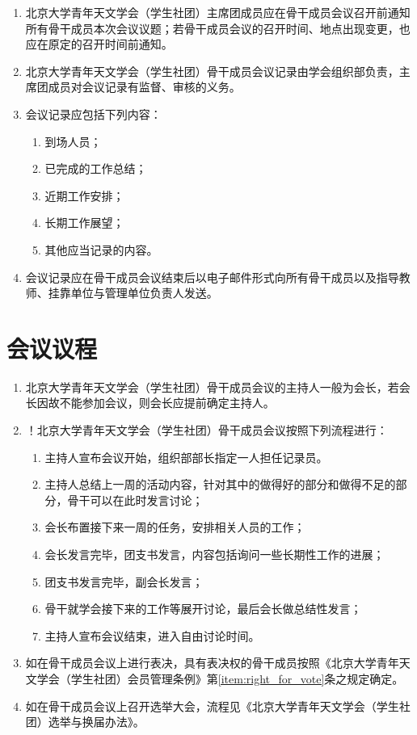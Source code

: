 \begin{enumerate}[resume]
    \item 北京大学青年天文学会（学生社团）主席团成员应在骨干成员会议召开前通知所有骨干成员本次会议议题；若骨干成员会议的召开时间、地点出现变更，也应在原定的召开时间前通知。
    
    \item 北京大学青年天文学会（学生社团）骨干成员会议记录由学会组织部负责，主席团成员对会议记录有监督、审核的义务。
    
    \item 会议记录应包括下列内容：
    \begin{enumerate}
        \item 到场人员；
        \item 已完成的工作总结；
        \item 近期工作安排；
        \item 长期工作展望；
        \item 其他应当记录的内容。
    \end{enumerate}
    
    \item 会议记录应在骨干成员会议结束后以电子邮件形式向所有骨干成员以及指导教师、挂靠单位与管理单位负责人发送。
\end{enumerate}

\section{会议议程}

\begin{enumerate}[resume]
    \item 北京大学青年天文学会（学生社团）骨干成员会议的主持人一般为会长，若会长因故不能参加会议，则会长应提前确定主持人。
    
    \item ！北京大学青年天文学会（学生社团）骨干成员会议按照下列流程进行：
    \begin{enumerate}
        \item 主持人宣布会议开始，组织部部长指定一人担任记录员。
        \item 主持人总结上一周的活动内容，针对其中的做得好的部分和做得不足的部分，骨干可以在此时发言讨论；
        \item 会长布置接下来一周的任务，安排相关人员的工作；
        \item 会长发言完毕，团支书发言，内容包括询问一些长期性工作的进展；
        \item 团支书发言完毕，副会长发言；
        \item 骨干就学会接下来的工作等展开讨论，最后会长做总结性发言；
        \item 主持人宣布会议结束，进入自由讨论时间。
    \end{enumerate}

    \item 如在骨干成员会议上进行表决，具有表决权的骨干成员按照《北京大学青年天文学会（学生社团）会员管理条例》第\ref{item:right_for_vote}条之规定确定。

    \item 如在骨干成员会议上召开选举大会，流程见《北京大学青年天文学会（学生社团）选举与换届办法》。
\end{enumerate}

